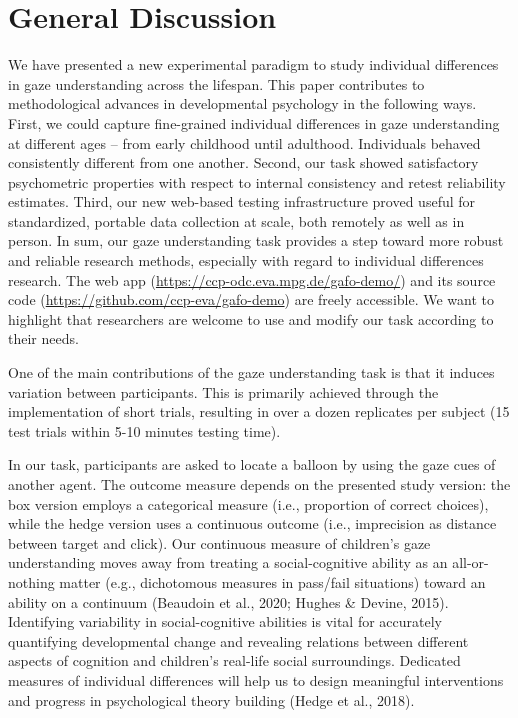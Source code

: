 \documentclass[
  man,floatsintext]{apa6}
\begin{document}
\hypertarget{general-discussion}{%
\section{General Discussion}\label{general-discussion}}

We have presented a new experimental paradigm to study individual differences in gaze understanding across the lifespan.
This paper contributes to methodological advances in developmental psychology in the following ways.
First, we could capture fine-grained individual differences in gaze understanding at different ages -- from early childhood until adulthood.
Individuals behaved consistently different from one another.
Second, our task showed satisfactory psychometric properties with respect to internal consistency and retest reliability estimates.
Third, our new web-based testing infrastructure proved useful for standardized, portable data collection at scale, both remotely as well as in person.
In sum, our gaze understanding task provides a step toward more robust and reliable research methods, especially with regard to individual differences research.
The web app (\url{https://ccp-odc.eva.mpg.de/gafo-demo/}) and its source code (\url{https://github.com/ccp-eva/gafo-demo}) are freely accessible.
We want to highlight that researchers are welcome to use and modify our task according to their needs.

One of the main contributions of the gaze understanding task is that it induces variation between participants.
This is primarily achieved through the implementation of short trials, resulting in over a dozen replicates per subject (15 test trials within 5-10 minutes testing time).

In our task, participants are asked to locate a balloon by using the gaze cues of another agent.
The outcome measure depends on the presented study version: the box version employs a categorical measure (i.e., proportion of correct choices), while the hedge version uses a continuous outcome (i.e., imprecision as distance between target and click).
Our continuous measure of children's gaze understanding moves away from treating a social-cognitive ability as an all-or-nothing matter (e.g., dichotomous measures in pass/fail situations) toward an ability on a continuum (Beaudoin et al., 2020; Hughes \& Devine, 2015).
Identifying variability in social-cognitive abilities is vital for accurately quantifying developmental change and revealing relations between different aspects of cognition and children's real-life social surroundings.
Dedicated measures of individual differences will help us to design meaningful interventions and progress in psychological theory building (Hedge et al., 2018).
\end{document}
